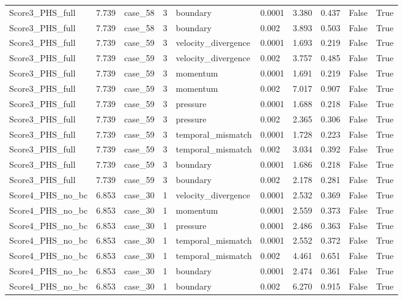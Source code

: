 \begin{longtable}{llllllllll}
Score3\_PHS\_full & 7.739 & case\_58 & 3 & boundary & 0.0001 & 3.380 & 0.437 & False & True \\
Score3\_PHS\_full & 7.739 & case\_58 & 3 & boundary & 0.002 & 3.893 & 0.503 & False & True \\
Score3\_PHS\_full & 7.739 & case\_59 & 3 & velocity\_divergence & 0.0001 & 1.693 & 0.219 & False & True \\
Score3\_PHS\_full & 7.739 & case\_59 & 3 & velocity\_divergence & 0.002 & 3.757 & 0.485 & False & True \\
Score3\_PHS\_full & 7.739 & case\_59 & 3 & momentum & 0.0001 & 1.691 & 0.219 & False & True \\
Score3\_PHS\_full & 7.739 & case\_59 & 3 & momentum & 0.002 & 7.017 & 0.907 & False & True \\
Score3\_PHS\_full & 7.739 & case\_59 & 3 & pressure & 0.0001 & 1.688 & 0.218 & False & True \\
Score3\_PHS\_full & 7.739 & case\_59 & 3 & pressure & 0.002 & 2.365 & 0.306 & False & True \\
Score3\_PHS\_full & 7.739 & case\_59 & 3 & temporal\_mismatch & 0.0001 & 1.728 & 0.223 & False & True \\
Score3\_PHS\_full & 7.739 & case\_59 & 3 & temporal\_mismatch & 0.002 & 3.034 & 0.392 & False & True \\
Score3\_PHS\_full & 7.739 & case\_59 & 3 & boundary & 0.0001 & 1.686 & 0.218 & False & True \\
Score3\_PHS\_full & 7.739 & case\_59 & 3 & boundary & 0.002 & 2.178 & 0.281 & False & True \\
Score4\_PHS\_no\_bc & 6.853 & case\_30 & 1 & velocity\_divergence & 0.0001 & 2.532 & 0.369 & False & True \\
Score4\_PHS\_no\_bc & 6.853 & case\_30 & 1 & momentum & 0.0001 & 2.559 & 0.373 & False & True \\
Score4\_PHS\_no\_bc & 6.853 & case\_30 & 1 & pressure & 0.0001 & 2.486 & 0.363 & False & True \\
Score4\_PHS\_no\_bc & 6.853 & case\_30 & 1 & temporal\_mismatch & 0.0001 & 2.552 & 0.372 & False & True \\
Score4\_PHS\_no\_bc & 6.853 & case\_30 & 1 & temporal\_mismatch & 0.002 & 4.461 & 0.651 & False & True \\
Score4\_PHS\_no\_bc & 6.853 & case\_30 & 1 & boundary & 0.0001 & 2.474 & 0.361 & False & True \\
Score4\_PHS\_no\_bc & 6.853 & case\_30 & 1 & boundary & 0.002 & 6.270 & 0.915 & False & True \\

\end{longtable}
